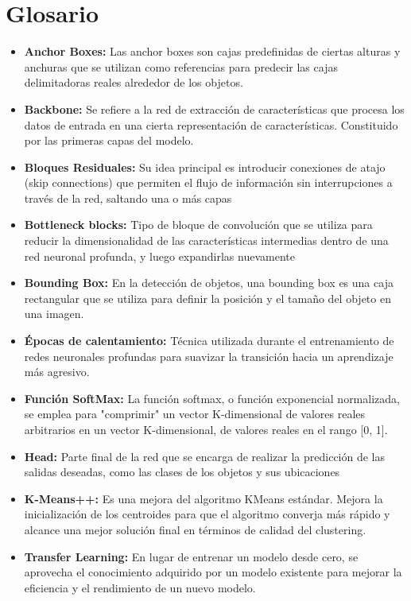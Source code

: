 \documentclass{article}
\begin{document}
\section{Glosario}
\begin{itemize}
\item{\textbf{Anchor Boxes:} Las anchor boxes son cajas predefinidas de ciertas alturas y anchuras que se utilizan como referencias para predecir las cajas delimitadoras reales alrededor de los objetos.}
\item{\textbf{Backbone:} Se refiere a la red de extracción de características que procesa los datos de entrada en una cierta representación de características. Constituido por las primeras capas del modelo.}
\item{\textbf{Bloques Residuales:} Su idea principal es introducir conexiones de atajo (skip connections) que permiten el flujo de información sin interrupciones a través de la red, saltando una o más capas}
\item{\textbf{Bottleneck blocks:} Tipo de bloque de convolución que se utiliza para reducir la dimensionalidad de las características intermedias dentro de una red neuronal profunda, y luego expandirlas nuevamente}
\item{\textbf{Bounding Box:} En la detección de objetos, una bounding box es una caja rectangular que se utiliza para definir la posición y el tamaño del objeto en una imagen.}
\item{\textbf{Épocas de calentamiento:} Técnica utilizada durante el entrenamiento de redes neuronales profundas para suavizar la transición hacia un aprendizaje más agresivo.}
\item{\textbf{Función SoftMax:} La función softmax, o función exponencial normalizada, se emplea para "comprimir" un vector K-dimensional  de valores reales arbitrarios en un vector K-dimensional, de valores reales en el rango [0, 1].}
\item{\textbf{Head:} Parte final de la red que se encarga de realizar la predicción de las salidas deseadas, como las clases de los objetos y sus ubicaciones}
\item{\textbf{K-Means++:} Es una mejora del algoritmo KMeans estándar. Mejora la inicialización de los centroides para que el algoritmo converja más rápido y alcance una mejor solución final en términos de calidad del clustering.}
\item{\textbf{Transfer Learning:} En lugar de entrenar un modelo desde cero, se aprovecha el conocimiento adquirido por un modelo existente para mejorar la eficiencia y el rendimiento de un nuevo modelo.}
\end{itemize}

 
\end{document}
